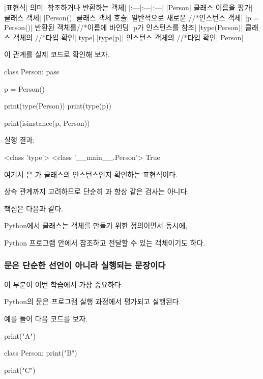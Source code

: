 \begin{dhktable}
|표현식|	의미|	참조하거나 반환하는 객체|
|:---|:---|:---|
|Person|	클래스 이름을 평가|	클래스 객체|
|Person()|	클래스 객체 호출|	일반적으로 새로운 //*인스턴스 객체|
|p = Person()|	반환된 객체를//*이름에 바인딩|	p가 인스턴스를 참조|
|type(Person)|	클래스 객체의 //*타입 확인|	type|
|type(p)|	인스턴스 객체의 //*타입 확인|	Person|
\end{dhktable}

이 관계를 실제 코드로 확인해 보자.

\begin{dhkcode}
class Person:
    pass

p = Person()

print(type(Person))
print(type(p))

print(isinstance(p, Person))
\end{dhkcode}

실행 결과:

\begin{dhkzsh}
<class 'type'>
<class '__main__.Person'>
True
\end{dhkzsh}

여기서 은 가  클래스의 인스턴스인지 확인하는 표현식이다.

상속 관계까지 고려하므로 단순히 과 항상 같은 검사는 아니다.

핵심은 다음과 같다.

\begin{dhksmry}[centered]
Python에서 클래스는 객체를 만들기 위한 정의이면서 동시에, 

Python 프로그램 안에서 참조하고 전달할 수 있는 객체이기도 하다.
\end{dhksmry}

\subsubsection{문은 단순한 선언이 아니라 실행되는 문장이다}

이 부분이 이번 학습에서 가장 중요하다.

Python의 문은 프로그램 실행 과정에서 평가되고 실행된다.

예를 들어 다음 코드를 보자.

\begin{dhkcode}
print("A")

class Person:
    print("B")

print("C")
\end{dhkcode}

